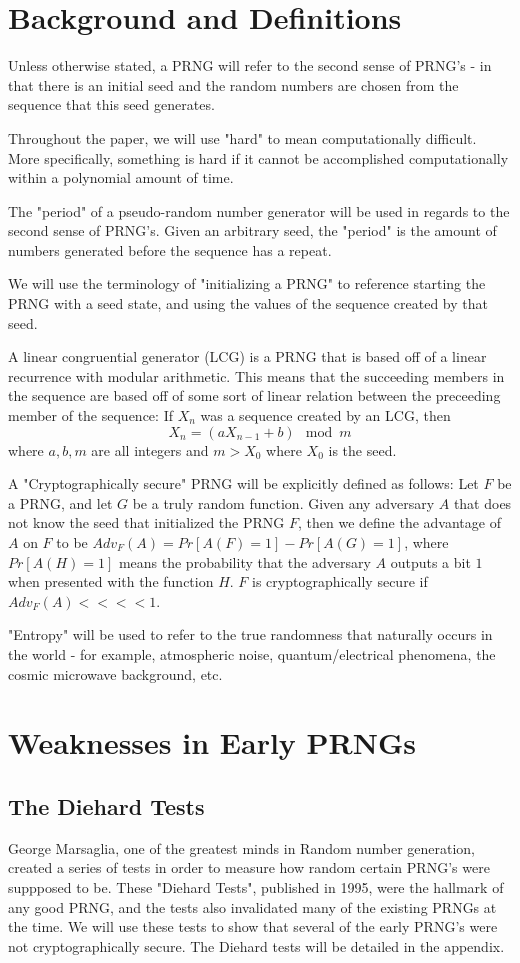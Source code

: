 \documentclass[11pt]{article}
\begin{document}
\section{Background and Definitions}
Unless otherwise stated, a PRNG will refer to the second sense of PRNG's - in that there is an initial seed and the random numbers are chosen from the sequence that this seed generates.


Throughout the paper, we will use "hard" to mean computationally difficult. More specifically, something is hard if it cannot be accomplished computationally within a polynomial amount of time. 

The "period" of a pseudo-random number generator will be used in regards to the second sense of PRNG's. Given an arbitrary seed, the "period" is the amount of numbers generated before the sequence has a repeat.

We will use the terminology of "initializing a PRNG" to reference starting the PRNG with a seed state, and using the values of the sequence created by that seed. 

A linear congruential generator (LCG) is a PRNG that is based off of a linear recurrence with modular arithmetic. This means that the succeeding members in the sequence are based off of some sort of linear relation between the preceeding member of the sequence: If $X_n$ was a sequence created by an LCG, then $$X_n = (aX_{n-1} + b)  \mod m$$ where $a, b, m$ are all integers and $m > X_0$ where $X_0$ is the seed. 

A "Cryptographically secure" PRNG will be explicitly defined as follows: Let $F$ be a PRNG, and let $G$ be a truly random function. Given any adversary $A$ that does not know the seed that initialized the PRNG $F$, then we define the advantage of $A$ on $F$ to be $Adv_F(A) = Pr[A(F) = 1] - Pr[A(G) = 1]$, where $Pr[A(H) = 1]$ means the probability that the adversary $A$ outputs a bit $1$ when presented with the function $H$. $F$ is cryptographically secure if $Adv_F(A) <<<< 1$. 

"Entropy" will be used to refer to the true randomness that naturally occurs in the world - for example, atmospheric noise, quantum/electrical phenomena, the cosmic microwave background, etc. 


\section{Weaknesses in Early PRNGs}
\subsection{The Diehard Tests}
George Marsaglia, one of the greatest minds in Random number generation, created a series of tests in order to measure how random certain PRNG's were suppposed to be. These "Diehard Tests", published in 1995, were the hallmark of any good PRNG, and the tests also invalidated many of the existing PRNGs at the time. We will use these tests to show that several of the early PRNG's were not cryptographically secure. The Diehard tests will be detailed in the appendix. 
\end{document}
